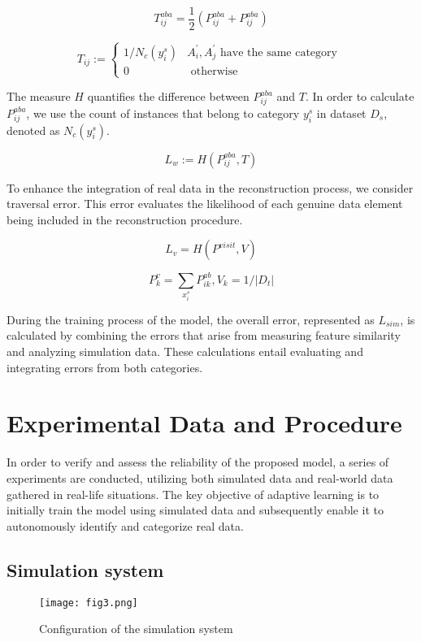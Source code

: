 \documentclass[conference]{IEEEtran}
\begin{document}
$$
T_{i j}^{a b a}=\frac{1}{2}\left(P_{i j}^{a b a}+P_{i j}^{a b a}\right)
$$

$$
T_{ij}:= \begin{cases}1 / N_{c}(y_{i}^{s}) & A_{i}^{\prime}, A_{j}^{\prime} \text { have the same category } \\ 0 & \text { otherwise }\end{cases}
$$

The measure $H$ quantifies the difference between $P_{ij}^{aba}$ and $T$. In order to calculate $P_{ij}^{aba}$, we use the count of instances that belong to category $y_{i}^{s}$ in dataset $D_{s}$, denoted as $N_{c}(y_{i}^{s})$.

$$
L_{w}:=H(P_{ij}^{aba}, T)
$$

To enhance the integration of real data in the reconstruction process, we consider traversal error. This error evaluates the likelihood of each genuine data element being included in the reconstruction procedure.

$$
L_{v}=H(P^{visit}, V)
$$

$$
P_{k}^{v}=\sum_{x_{i}^{s}} P_{i k}^{ab}, V_{k}=1/|D_{t}|
$$

During the training process of the model, the overall error, represented as $L_{sim}$, is calculated by combining the errors that arise from measuring feature similarity and analyzing simulation data. These calculations entail evaluating and integrating errors from both categories.

\section{Experimental Data and Procedure}

In order to verify and assess the reliability of the proposed model, a series of experiments are conducted, utilizing both simulated data and real-world data gathered in real-life situations. The key objective of adaptive learning is to initially train the model using simulated data and subsequently enable it to autonomously identify and categorize real data.

\subsection{Simulation system}

\begin{figure}[htbp]
\centerline{\texttt{[image: fig3.png]}}
\caption{Configuration of the simulation system}
\label{fig}
\end{figure}
\end{document}
